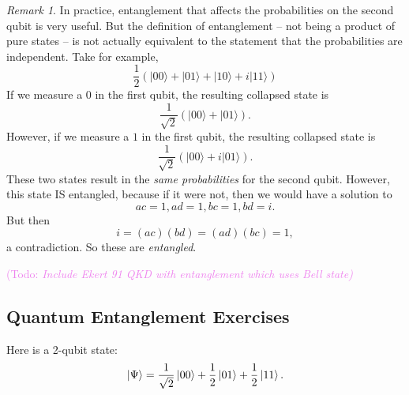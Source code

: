 \documentclass{article}
\theoremstyle{plain}
\theoremstyle{definition}
\theoremstyle{remark}
\newtheorem{remark}[theorem]{Remark}
\numberwithin{theorem}{section}
\newcommand{\KS}[1]{\textcolor{violet}{{\sf (Todo:} {\sl{#1})}}}
\newcommand{\KS}[1]{}
\begin{document}
\begin{remark}
    In practice, entanglement that affects the probabilities on the second qubit is very useful.  But the definition of entanglement -- not being a product of pure states -- is not actually equivalent to the statement that the probabilities are independent.  Take for example,
    \[
    \frac{1}{2} \left( 
    |00 \rangle + 
    |01 \rangle + 
    |10 \rangle +
    i|11 \rangle
    \right)
    \]
    If we measure a $0$ in the first qubit, the resulting collapsed state is
    \[
    \frac{1}{\sqrt{2}} \left(
    |00 \rangle + |01 \rangle
    \right).
    \]
    However, if we measure a $1$ in the first qubit, the resulting collapsed state is
    \[
    \frac{1}{\sqrt{2}} \left(
    |00 \rangle + i|01 \rangle
    \right).
    \]
    These two states result in the \emph{same probabilities} for the second qubit.  However, this state IS entangled, because if it were not, then we would have a solution to
    \[
    ac = 1, ad = 1, bc = 1, bd = i.
    \]
    But then
    \[
    i = (ac)(bd) = (ad)(bc) = 1,
    \]
    a contradiction.  So these are \emph{entangled}.
\end{remark}


\KS{Include Ekert 91 QKD with entanglement which uses Bell state}

\subsection{Quantum Entanglement Exercises}

	Here is a 2-qubit state:
		\[
			\ket{\Psi} = \frac{1}{\sqrt{2}}\ket{00} + \frac{1}{2}\ket{01} + \frac{1}{2}\ket{11}.
		\]
\end{document}
